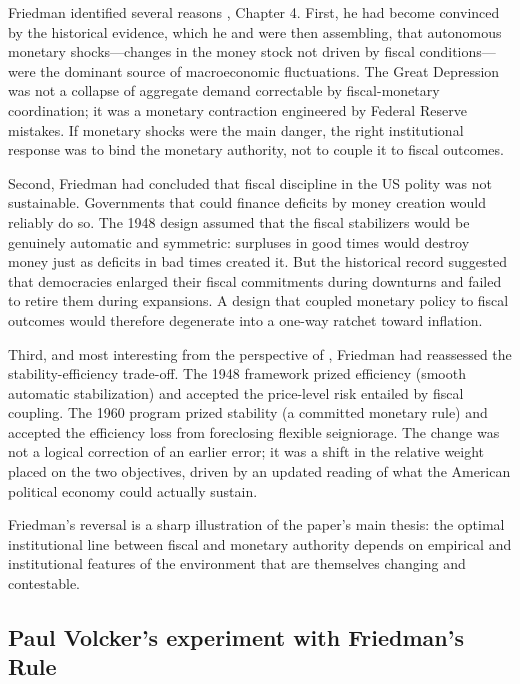 \documentclass[12pt]{article}
\begin{document}
Friedman identified several reasons \citep{Friedman1960}, Chapter 4.
First, he had become convinced by the historical evidence, which he and
\citet{FriedmanSchwartz1963} were then assembling, that autonomous
monetary shocks---changes in the money stock not driven by fiscal
conditions---were the dominant source of macroeconomic fluctuations.
The Great Depression was not a collapse of aggregate demand correctable
by fiscal-monetary coordination; it was a monetary
contraction engineered by Federal Reserve mistakes.  If monetary shocks
were the main danger, the right institutional response was to bind the
monetary authority, not to couple it to fiscal outcomes.

Second, Friedman had concluded that fiscal discipline in the US polity was not sustainable.  Governments that could finance
deficits by money creation would reliably do so.  The 1948 design assumed
that the fiscal stabilizers would be genuinely automatic and symmetric:
surpluses in good times would destroy money just as deficits in bad times
created it.  But the historical record suggested that democracies enlarged
their fiscal commitments during downturns and failed to retire them
during expansions.  A design that coupled monetary policy to fiscal
outcomes would therefore degenerate into a one-way ratchet toward
inflation.

Third, and most interesting from the perspective of
\citet{Sargent2011}, Friedman had reassessed 
the stability-efficiency trade-off.  The 1948 framework prized efficiency
(smooth automatic stabilization) and accepted the price-level risk
entailed by fiscal coupling.  The 1960 program prized stability
(a committed monetary rule) and accepted the efficiency loss from
foreclosing flexible seigniorage.  The change was not a logical
correction of an earlier error; it was a shift in the relative weight
placed on the two objectives, driven by an updated reading of what
the American political economy could actually sustain.

Friedman's reversal is a sharp illustration of the paper's main thesis:
the optimal institutional line between fiscal and monetary authority
depends on empirical and institutional features of the environment that
are themselves changing and contestable.

\subsection{Paul Volcker's experiment with  Friedman's Rule}
\end{document}
